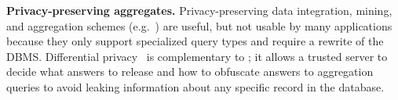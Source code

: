 

 
{\bf Privacy-preserving aggregates.}
Privacy-preserving data integration, mining, and aggregation
schemes (e.g.~\cite{Kantarcioglu-Clifton-2005, Xiong-2007}) are
useful, but not usable by many applications because they only support
specialized query types and require a rewrite of the DBMS\@.
Differential privacy~\cite{dwork-survey} is complementary
to \name{}; it allows a trusted server to decide what answers to
release and how to obfuscate answers to aggregation queries to avoid
leaking information about any specific record in the database.

